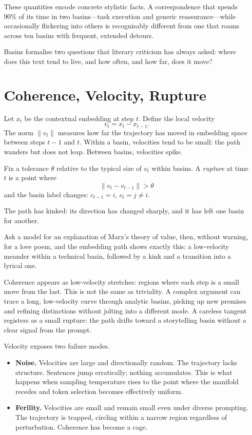 \documentclass[12pt,a4paper]{article}
\begin{document}
These quantities encode concrete stylistic facts. A correspondence that spends 90\% of its time in two basins---task execution and generic reassurance---while occasionally flickering into others is recognisably different from one that roams across ten basins with frequent, extended detours.

Basins formalise two questions that literary criticism has always asked: where does this text tend to live, and how often, and how far, does it move?


\section{Coherence, Velocity, Rupture}

Let $x_t$ be the contextual embedding at step $t$. Define the local velocity
\[
v_t = x_t - x_{t-1}.
\]
The norm $\|v_t\|$ measures how far the trajectory has moved in embedding space between steps $t-1$ and $t$. Within a basin, velocities tend to be small: the path wanders but does not leap. Between basins, velocities spike.

\begin{formalbox}[title={Rupture as Kink in the Trajectory}]
Fix a tolerance $\theta$ relative to the typical size of $v_t$ within basins. A \emph{rupture} at time $t$ is a point where
\[
\|v_t - v_{t-1}\| > \theta
\]
and the basin label changes: $c_{t-1} = i$, $c_t = j \neq i$.

The path has kinked: its direction has changed sharply, and it has left one basin for another.
\end{formalbox}

Ask a model for an explanation of Marx's theory of value, then, without warning, for a love poem, and the embedding path shows exactly this: a low-velocity meander within a technical basin, followed by a kink and a transition into a lyrical one.

Coherence appears as low-velocity stretches: regions where each step is a small move from the last. This is not the same as triviality. A complex argument can trace a long, low-velocity curve through analytic basins, picking up new premises and refining distinctions without jolting into a different mode. A careless tangent registers as a small rupture: the path drifts toward a storytelling basin without a clear signal from the prompt.

Velocity exposes two failure modes.

\begin{itemize}
  \item \textbf{Noise.} Velocities are large and directionally random. The trajectory lacks structure. Sentences jump erratically; nothing accumulates. This is what happens when sampling temperature rises to the point where the manifold recedes and token selection becomes effectively uniform.

  \item \textbf{Ferility.} Velocities are small and remain small even under diverse prompting. The trajectory is trapped, circling within a narrow region regardless of perturbation. Coherence has become a cage.
\end{itemize}
\end{document}
